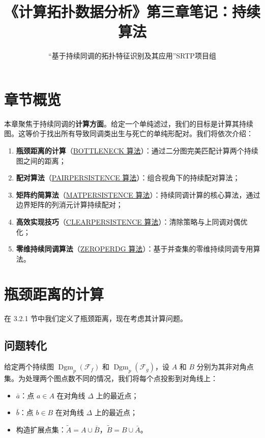 \documentclass[UTF8]{ctexart}
\title{《计算拓扑数据分析》第三章笔记：持续算法}
\author{“基于持续同调的拓扑特征识别及其应用”SRTP项目组}
\date{}
\begin{document}
\maketitle

\tableofcontents
\newpage

\section*{章节概览}

本章聚焦于持续同调的\textbf{计算方面}。给定一个单纯滤过，我们的目标是计算其持续图。这等价于找出所有导致同调类出生与死亡的单纯形配对。我们将依次介绍：

\begin{enumerate}
    \item \textbf{瓶颈距离的计算}（\hyperref[sec:bottleneck]{BOTTLENECK 算法}）：通过二分图完美匹配计算两个持续图之间的距离；
    \item \textbf{配对算法}（\hyperref[sec:pairpersistence]{PAIRPERSISTENCE 算法}）：组合视角下的持续配对算法；
    \item \textbf{矩阵约简算法}（\hyperref[sec:matpersistence]{MATPERSISTENCE 算法}）：持续同调计算的核心算法，通过边界矩阵的列消元计算持续配对；
    \item \textbf{高效实现技巧}（\hyperref[sec:clearpersistence]{CLEARPERSISTENCE 算法}）：清除策略与上同调对偶优化；
    \item \textbf{零维持续同调算法}（\hyperref[sec:zeroperdg]{ZEROPERDG 算法}）：基于并查集的零维持续同调专用算法。
\end{enumerate}

\section{瓶颈距离的计算}
\label{sec:bottleneck}

在 3.2.1 节中我们定义了瓶颈距离，现在考虑其计算问题。

\subsection{问题转化}

给定两个持续图 \(\operatorname{Dgm}_p(\mathcal{F}_f)\) 和 \(\operatorname{Dgm}_p(\mathcal{F}_g)\)，设 \(A\) 和 \(B\) 分别为其非对角点集。为处理两个图点数不同的情况，我们将每个点投影到对角线上：

\begin{itemize}
    \item \(\bar{a}\)：点 \(a \in A\) 在对角线 \(\Delta\) 上的最近点；
    \item \(\bar{b}\)：点 \(b \in B\) 在对角线 \(\Delta\) 上的最近点；
    \item 构造扩展点集：\(\tilde{A} = A \cup \bar{B}\)，\(\tilde{B} = B \cup \bar{A}\)。
\end{itemize}
\end{document}
